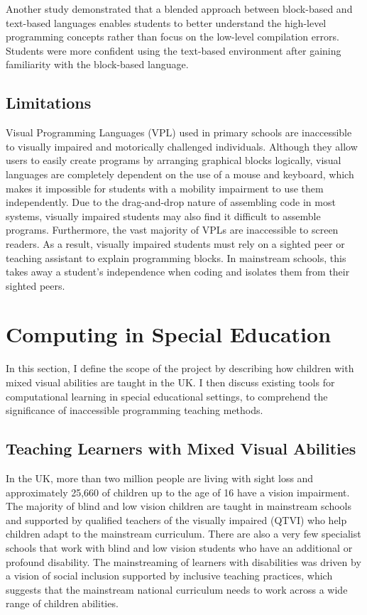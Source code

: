 \documentclass[oneside,%
                    author={Malak Hajji},
                    degree={BSc},
                    title={Designing An Accessible Ozobot Programming Platform for Students},
                  subtitle={With Mixed Visual Abilities}]{dissertation}
\begin{document}
Another study\cite{study2-impact} demonstrated that a blended approach between block-based and text-based languages enables students to better understand the high-level programming concepts rather than focus on the low-level compilation errors. Students were more confident using the text-based environment after gaining familiarity with the block-based language. 
 
\subsection{Limitations}

Visual Programming Languages (VPL) used in primary schools are inaccessible to visually impaired and motorically challenged individuals\cite{motorical}. Although they  allow users to easily create programs by arranging graphical blocks logically, visual languages are completely dependent on the use of a mouse and keyboard, which makes it impossible for students with a mobility impairment to use them independently. Due to the drag-and-drop nature of assembling code in most systems, visually impaired students may also find it difficult to assemble programs. Furthermore, the vast majority of VPLs are inaccessible to screen readers. As a result, visually impaired students must rely on a sighted peer or teaching assistant to explain programming blocks\cite{limitations}. In mainstream schools, this takes away a student's independence when coding and isolates them from their sighted peers\cite{metatla}.


\section{Computing in Special Education}
In this section, I define the scope of the project by describing how children with mixed visual abilities are taught in the UK. I then discuss existing tools for computational learning in special educational settings, to comprehend the significance of inaccessible programming teaching methods.

\subsection{Teaching Learners with Mixed Visual Abilities}

In the UK, more than two million people are living with sight loss and approximately 25,660 of children up to the age of 16 have a vision impairment\cite{nhs,rnib}. The majority of blind and low vision children are taught in mainstream schools\cite{rnib} and supported by qualified teachers of the visually impaired (QTVI) who help children adapt to the mainstream curriculum. There are also a very few specialist schools that work with blind and low vision students who have an additional or profound disability. The mainstreaming of learners with disabilities was driven by a vision of social inclusion supported by inclusive teaching practices\cite{parliment}, which suggests that the mainstream national curriculum needs to work across a wide range of children abilities. 
\end{document}
